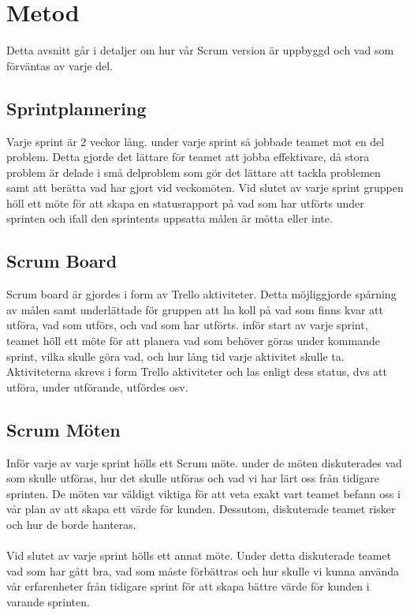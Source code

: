 \section{Metod}
\label{sec:Lieth-Metod}
Detta avsnitt går i detaljer om hur vår Scrum version är uppbyggd och vad som förväntas av varje del.

\subsection{Sprintplannering}
\label{subsec:Lieth-Sprintplannering}
Varje sprint är 2 veckor lång. under varje sprint så jobbade teamet mot en del problem. Detta gjorde det lättare 
för teamet att jobba effektivare, då stora problem är delade i små delproblem som gör det lättare att tackla problemen 
samt att berätta vad  har gjort vid veckomöten. Vid slutet av varje sprint gruppen höll ett möte för att skapa en 
statusrapport på vad som har utförts under sprinten och ifall den sprintents uppsatta målen är mötta eller inte.


\subsection{Scrum Board}
\label{subsec:Lieth-Scrum Board}
Scrum board är gjordes i form av Trello aktiviteter. Detta möjliggjorde spårning av målen samt underlättade för gruppen att ha 
koll på vad som finns kvar att utföra, vad som utförs, och vad som har utförts. inför start av varje sprint, teamet höll ett möte 
för att planera vad som behöver göras under kommande sprint, vilka skulle göra vad, och hur lång tid varje aktivitet skulle ta. 
Aktiviteterna skrevs i form Trello aktiviteter och las enligt dess status, dvs att utföra, under utförande, utfördes osv.

\subsection{Scrum Möten}
\label{subsec:Lieth-Scrum Möten}
Inför varje av varje sprint hölls ett Scrum möte. under de möten diskuterades vad som skulle utföras, hur det skulle utföras och 
vad vi har lärt oss från tidigare sprinten. De möten var väldigt viktiga för att veta exakt vart teamet befann oss i vår plan av att 
skapa ett värde för kunden. Dessutom, diskuterade teamet risker och hur de borde hanteras.  
\\
\\Vid slutet av varje sprint hölls ett annat möte. Under detta diskuterade teamet vad som har gått bra, vad som måste förbättras 
och hur skulle vi kunna använda vår erfarenheter från tidigare sprint för att skapa bättre värde för kunden i varande sprinten. 

